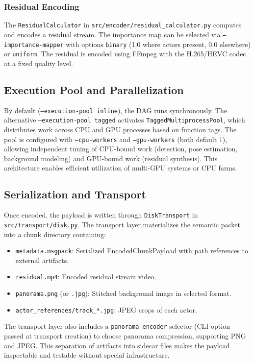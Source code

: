 \documentclass[manuscript, screen]{acmart}
\begin{document}
\subsubsection{Residual Encoding}
The \texttt{ResidualCalculator} in \texttt{src/encoder/residual\_calculator.py} computes and encodes a residual stream. The importance map can be selected via \texttt{--importance-mapper} with options \texttt{binary} (1.0 where actors present, 0.0 elsewhere) or \texttt{uniform}. The residual is encoded using FFmpeg with the H.265/HEVC codec at a fixed quality level.

\subsection{Execution Pool and Parallelization}
By default (\texttt{--execution-pool inline}), the DAG runs synchronously. The alternative \texttt{--execution-pool tagged} activates \texttt{TaggedMultiprocessPool}, which distributes work across CPU and GPU processes based on function tags. The pool is configured with \texttt{--cpu-workers} and \texttt{--gpu-workers} (both default 1), allowing independent tuning of CPU-bound work (detection, pose estimation, background modeling) and GPU-bound work (residual synthesis). This architecture enables efficient utilization of multi-GPU systems or CPU farms.

\subsection{Serialization and Transport}
Once encoded, the payload is written through \texttt{DiskTransport} in \texttt{src/transport/disk.py}. The transport layer materializes the semantic packet into a chunk directory containing:
\begin{itemize}[topsep=0pt,itemsep=0pt,leftmargin=*]
    \item \texttt{metadata.msgpack}: Serialized EncodedChunkPayload with path references to external artifacts.
    \item \texttt{residual.mp4}: Encoded residual stream video.
    \item \texttt{panorama.png} (or \texttt{.jpg}): Stitched background image in selected format.
    \item \texttt{actor\_references/track\_*.jpg}: JPEG crops of each actor.
\end{itemize}
The transport layer also includes a \texttt{panorama\_encoder} selector (CLI option passed at transport creation) to choose panorama compression, supporting PNG and JPEG. This separation of artifacts into sidecar files makes the payload inspectable and testable without special infrastructure.
\end{document}
